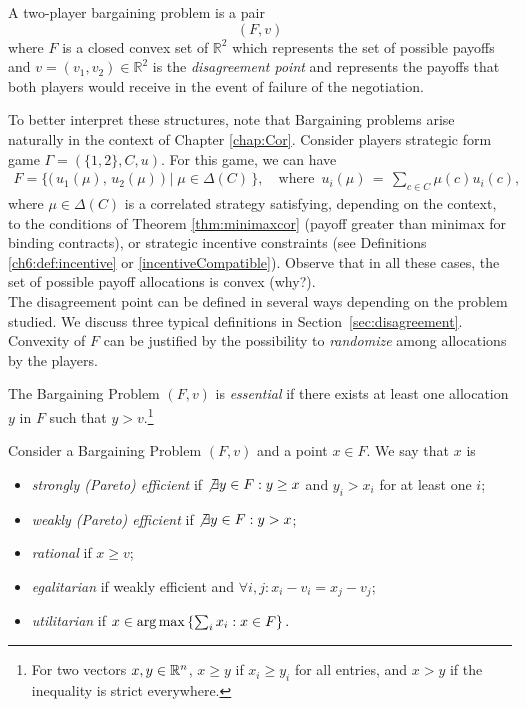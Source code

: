 \begin{definition}
A two-player bargaining problem is a pair
$$(F, v)$$ where $F$ is a closed convex set of $\mathbb{R}^2$ which represents the set of possible payoffs and $v = (v_1, v_2) \in \mathbb{R}^2$ is the \emph{disagreement point} and represents the payoffs that both players would receive in the event of failure of the negotiation.
\end{definition}
To better interpret these structures, note that Bargaining problems arise naturally in the context of Chapter \ref{chap:Cor}.
Consider players strategic form game $\Gamma = (\{1,2\}, C, u)$.
For this game, we can have
\begin{align*}
	F = \Big\{ \big( \, u_1(\mu), \, u_2(\mu) \, \big) \; | \; \mu \in \Delta(C) \, \Big\}, \quad \text{where } \, u_i(\mu) \, = \, \sum_{c \in C} \mu(c) u_i(c),
\end{align*}
where $\mu \in \Delta(C)$ is a correlated strategy satisfying, depending on the context, to the conditions of Theorem \ref{thm:minimaxcor} (payoff greater than minimax for binding contracts), or strategic incentive constraints (see Definitions \ref{ch6:def:incentive} or \ref{incentiveCompatible}). Observe that in all these cases, the set of possible payoff allocations is convex (why?).\\
The disagreement point can be defined in several ways depending on the problem studied. We discuss three typical definitions in Section~\ref{sec:disagreement}.\\
Convexity of $F$ can be justified by the possibility to \emph{randomize} among allocations by the players.

\begin{definition}[Essential]
The Bargaining Problem $(F, v)$ is \emph{essential} if there exists at least one allocation $y$ in $F$ such that $y > v$.\footnote{For two vectors $x,y \in \mathbb{R}^n$, $x \geq y$ if $x_i \geq y_i$ for all entries, and $x > y$ if the inequality is strict everywhere.}
\end{definition}
 \vspace{2cm}

\begin{definition}
Consider a Bargaining Problem $(F, v)$ and a point $x \in F$. We say that $x$ is
\begin{itemize}
\item \emph{strongly (Pareto) efficient} if $\not \exists y \in F: y \geq x$ and $y_i > x_i$ for at least one $i$;
\item \emph{weakly (Pareto) efficient} if $\not \exists y \in F: y > x$;
\item \emph{rational} if $x \geq v$;
\item \emph{egalitarian} if weakly efficient and $\forall i,j: x_i-v_i = x_j-v_j$;
\item \emph{utilitarian} if
$x \in \operatorname*{arg\,max} \left \{ \sum_i x_i : x \in F \right \}.$
\end{itemize}
\label{defEffiEgalUti}
\end{definition}

